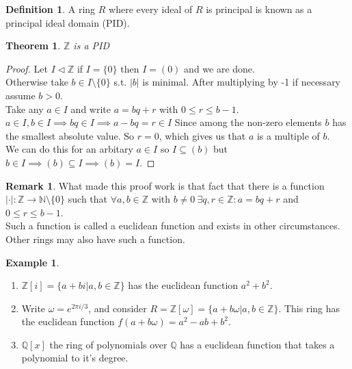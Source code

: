 \documentclass{book}
\newtheorem*{thm}{Theorem}
\theoremstyle{definition}
\newtheorem*{defn}{Definition}
\newtheorem*{ex}{Example}
\newtheorem*{rem}{Remark}
\newcommand{\ZZ}{\mathbb{Z}}
\newcommand{\QQ}{\mathbb{Q}}
\newcommand{\NN}{\mathbb{N}}
\begin{document}
\begin{defn}
A ring $R$ where every ideal of $R$ is principal is known as a principal ideal domain (PID).
\end{defn}
\begin{thm}
$\ZZ$ is a PID
\end{thm}
\begin{proof}
Let $I \triangleleft \ZZ$ if $I=\{0\}$ then $I = (0)$ and we are done. \\
Otherwise take $b \in I\setminus \{0\}$ s.t. $|b|$ is minimal. After multiplying by -1 if necessary assume $b > 0$. \\
Take any $a \in I$ and write $a = bq + r$ with $0 \leq r \leq b-1$. \\
$a \in I, b \in I \implies bq \in I \implies a-bq =r \in I$ Since among the non-zero elements $b$ has the smallest absolute value. So $r=0$, which gives us that $a$ is a multiple of $b$. \\
We can do this for an arbitary $a \in I$ so $I \subseteq (b)$ but $b \in I \implies (b) \subseteq I \implies (b) = I$.
\end{proof}
\begin{rem}
What made this proof work is that fact that there is a function $|\cdot|:\ZZ \rightarrow \NN \setminus\{0\}$ such that $\forall a,b \in \ZZ$ with $b\neq 0\ \exists q,r \in \ZZ: a=bq+r$ and $0 \leq r \leq b-1$. \\
Such a function is called a euclidean function and exists in other circumstances. Other rings may also have such a function.
\end{rem}
\begin{ex}
\begin{enumerate}
\item $\ZZ[i] = \{a+bi|a,b \in \ZZ\}$ has the euclidean function $a^2+b^2$.
\item Write $\omega = e^{2\pi i /3}$, and consider $R = \ZZ[\omega] = \{a+b\omega|a,b\in\ZZ\}$. This ring has the euclidean function $f(a+b\omega) = a^2-ab+b^2$.
\item $\QQ[x]$ the ring of polynomials over $\QQ$ has a euclidean function that takes a polynomial to it's degree.
\end{enumerate}
\end{ex}
\end{document}
